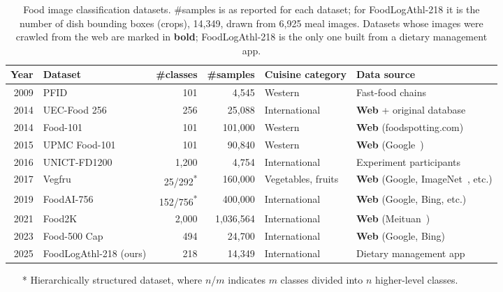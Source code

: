 \begin{table}[thb]
\centering
\caption{Food image classification datasets. \#samples is as reported for each dataset; for FoodLogAthl-218 it is the number of dish bounding boxes (crops), 14,349, drawn from 6,925 meal images. Datasets whose images were crawled from the web are marked in \textbf{bold}; FoodLogAthl-218 is the only one built from a dietary management app.}
\small
\setlength{\tabcolsep}{4pt}
\begin{tabular}{@{}rlrrll@{}}
\toprule
Year & Dataset & \#classes & \#samples & Cuisine category & Data source \\
\midrule
2009 & PFID~\cite{chen2009pfid} & 101 & 4,545 & Western & Fast-food chains \\
2014 & UEC-Food 256~\cite{kawano2015automatic} & 256 & 25,088 & International & \textbf{Web} + original database \\
2014 & Food-101~\cite{bossard2014food} & 101 & 101,000 & Western & \textbf{Web} (foodspotting.com) \\
2015 & UPMC Food-101~\cite{wang2015recipe} & 101 & 90,840 & Western & \textbf{Web} (Google~\cite{google}) \\
2016 & UNICT-FD1200~\cite{farinella2016retrieval} & 1,200 & 4,754 & International & Experiment participants \\
2017 & Vegfru~\cite{hou2017vegfru} & 25/292\textsuperscript{*} & 160,000 & Vegetables, fruits & \textbf{Web} (Google, ImageNet~\cite{imagenet}, etc.) \\
2019 & FoodAI-756~\cite{sahoo2019foodai} & 152/756\textsuperscript{*} & 400,000 & International & \textbf{Web} (Google, Bing, etc.) \\
2021 & Food2K~\cite{min2023large} & 2,000 & 1,036,564 & International & \textbf{Web} (Meituan~\cite{meituan}) \\
2023 & Food-500 Cap~\cite{ma2023food} & 494 & 24,700 & International & \textbf{Web} (Google, Bing) \\
\midrule
2025 & FoodLogAthl-218 (ours) & 218 & 14,349 & International & Dietary management app \\
\bottomrule
\end{tabular}
\label{Food image dataset table}

\begin{itemize}[leftmargin=7.2em]
\setlength{\parskip}{0cm} \setlength{\itemsep}{0cm} \item[*] Hierarchically structured dataset, where $n$/$m$ indicates $m$ classes divided into $n$ higher-level classes.
\end{itemize}
\end{table}
